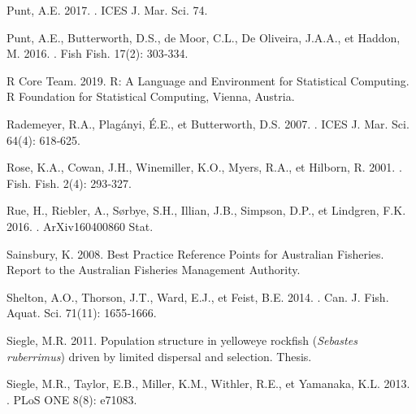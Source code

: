 \documentclass[french,11pt]{book}
\begin{document}
\begin{CSLReferences}{1}{0}
%
Punt, A.E. 2017. . ICES J. Mar. Sci. 74.

%
Punt, A.E., Butterworth, D.S., de Moor, C.L., De Oliveira, J.A.A., et Haddon, M. 2016. . Fish Fish. 17(2): 303‑334.

%
R Core Team. 2019. R: A Language and Environment for Statistical Computing. {R Foundation for Statistical Computing}, Vienna, Austria.

%
Rademeyer, R.A., Plagányi, É.E., et Butterworth, D.S. 2007. . ICES J. Mar. Sci. 64(4): 618‑625.

%
Rose, K.A., Cowan, J.H., Winemiller, K.O., Myers, R.A., et Hilborn, R. 2001. . Fish. Fish. 2(4): 293‑327.

%
Rue, H., Riebler, A., Sørbye, S.H., Illian, J.B., Simpson, D.P., et Lindgren, F.K. 2016. . ArXiv160400860 Stat.

%
Sainsbury, K. 2008. Best {Practice Reference Points} for {Australian Fisheries}. {Report} to the {Australian Fisheries Management Authority}.

%
Shelton, A.O., Thorson, J.T., Ward, E.J., et Feist, B.E. 2014. . Can. J. Fish. Aquat. Sci. 71(11): 1655‑1666.

%
Siegle, M.R. 2011. Population structure in yelloweye rockfish ({\emph{Sebastes ruberrimus}}) driven by limited dispersal and selection. Thesis.

%
Siegle, M.R., Taylor, E.B., Miller, K.M., Withler, R.E., et Yamanaka, K.L. 2013. . PLoS ONE 8(8): e71083.


\end{CSLReferences}
\end{document}
